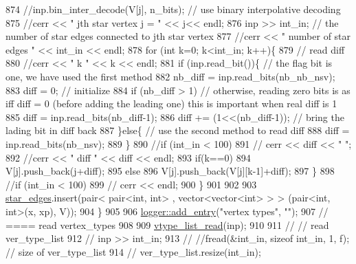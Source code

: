 \begin{DoxyCode}
874       \textcolor{comment}{//inp.bin\_inter\_decode(V[j], n\_bits); // use binary interpolative decoding}
875       \textcolor{comment}{//cerr << "  jth star vertex j = " << j<< endl; }
876       inp >> int\_in; \textcolor{comment}{// the number of star edges connected to jth star vertex}
877       \textcolor{comment}{//cerr << " number of star edges " << int\_in << endl;}
878       \textcolor{keywordflow}{for} (\textcolor{keywordtype}{int} k=0; k<int\_in; k++)\{
879         \textcolor{comment}{// read diff}
880         \textcolor{comment}{//cerr << " k " << k << endl;}
881         \textcolor{keywordflow}{if} (inp.read\_bit())\{ \textcolor{comment}{// the flag bit is one, we have used the first method }
882           nb\_diff = inp.read\_bits(nb\_nb\_nsv);
883           diff = 0; \textcolor{comment}{// initialize}
884           \textcolor{keywordflow}{if} (nb\_diff > 1) \textcolor{comment}{// otherwise, reading zero bits is as iff diff = 0 (before adding the leading
       one) this is important when real diff is 1}
885             diff = inp.read\_bits(nb\_diff-1);
886           diff += (1<<(nb\_diff-1)); \textcolor{comment}{// bring the lading bit in diff back }
887         \}\textcolor{keywordflow}{else}\{ \textcolor{comment}{// use the second method to read diff}
888           diff = inp.read\_bits(nb\_nsv);
889         \}
890         \textcolor{comment}{//if (int\_in < 100)}
891         \textcolor{comment}{//  cerr << diff << " ";}
892         \textcolor{comment}{//cerr << " diff " << diff << endl;}
893         \textcolor{keywordflow}{if}(k==0)
894           V[j].push\_back(j+diff);
895         \textcolor{keywordflow}{else}
896           V[j].push\_back(V[j][k-1]+diff);
897       \}
898       \textcolor{comment}{//if (int\_in < 100)}
899       \textcolor{comment}{//  cerr << endl;}
900     \}
901 
902 
903     \hyperlink{classmarked__graph__compressed_a7df5779d313486644132bd816937f532}{star\_edges}.insert(pair< pair<int, int> , vector<vector<int> > > (pair<int, int>(x, xp), V));
904   \}
905 
906   \hyperlink{classlogger_a710163deb17bc81f70d53d285b8ac9ac}{logger::add\_entry}(\textcolor{stringliteral}{"vertex types"}, \textcolor{stringliteral}{""});
907   \textcolor{comment}{// ==== read vertex\_types}
908 
909   \hyperlink{classmarked__graph__compressed_af29f16cbd56583652118eb24a7c233b7}{vtype\_list\_read}(inp);
910 
911   \textcolor{comment}{// // read ver\_type\_list}
912   \textcolor{comment}{// inp >> int\_in;}
913   \textcolor{comment}{// //fread(&int\_in, sizeof int\_in, 1, f); // size of ver\_type\_list}
914   \textcolor{comment}{// ver\_type\_list.resize(int\_in);}

\end{DoxyCode}
